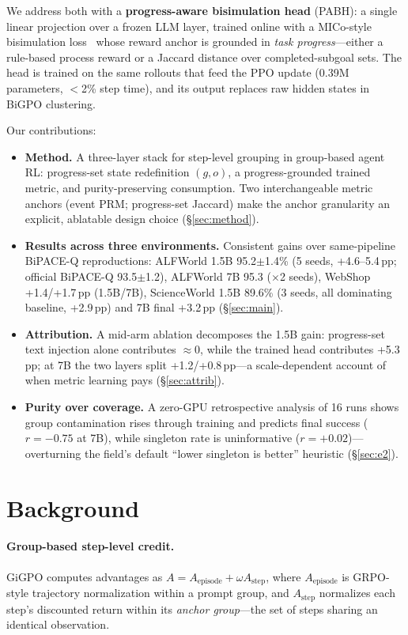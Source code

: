 \documentclass[sigconf]{acmart}
\newcommand{\method}{PABH}
\begin{document}
We address both with a \textbf{progress-aware bisimulation head}
(\method): a single linear projection over a frozen LLM layer, trained
online with a MICo-style bisimulation loss~\cite{micobisim} whose reward
anchor is grounded in \emph{task progress}---either a rule-based process
reward or a Jaccard distance over completed-subgoal sets. The head is
trained on the same rollouts that feed the PPO update (0.39M parameters,
$<$2\% step time), and its output replaces raw hidden states in BiGPO
clustering.

Our contributions:

\begin{itemize}
\item \textbf{Method.} A three-layer stack for step-level grouping in
group-based agent RL: progress-set state redefinition $(g,o)$, a
progress-grounded trained metric, and purity-preserving consumption.
Two interchangeable metric anchors (event PRM; progress-set Jaccard)
make the anchor granularity an explicit, ablatable design choice
(\S\ref{sec:method}).
\item \textbf{Results across three environments.} Consistent gains over
same-pipeline BiPACE-Q reproductions: ALFWorld 1.5B 95.2$\pm$1.4\%
(5 seeds, +4.6--5.4\,pp; official BiPACE-Q 93.5$\pm$1.2), ALFWorld 7B
95.3 ($\times$2 seeds), WebShop +1.4/+1.7\,pp (1.5B/7B), ScienceWorld
1.5B 89.6\% (3 seeds, all dominating baseline, +2.9\,pp) and 7B
final +3.2\,pp (\S\ref{sec:main}).
\item \textbf{Attribution.} A mid-arm ablation decomposes the 1.5B gain:
progress-set text injection alone contributes $\approx$0, while the
trained head contributes +5.3\,pp; at 7B the two layers split
+1.2/+0.8\,pp---a scale-dependent account of when metric learning pays
(\S\ref{sec:attrib}).
\item \textbf{Purity over coverage.} A zero-GPU retrospective analysis
of 16 runs shows group contamination rises through training and
predicts final success ($r=-0.75$ at 7B), while singleton rate is
uninformative ($r=+0.02$)---overturning the field's default
``lower singleton is better'' heuristic (\S\ref{sec:e2}).
\end{itemize}

\section{Background}
\label{sec:background}

\paragraph{Group-based step-level credit.}
GiGPO computes advantages as $A = A_{\text{episode}} + \omega
A_{\text{step}}$, where $A_{\text{episode}}$ is GRPO-style trajectory
normalization within a prompt group, and $A_{\text{step}}$ normalizes
each step's discounted return within its \emph{anchor group}---the set
of steps sharing an identical observation.
\end{document}
